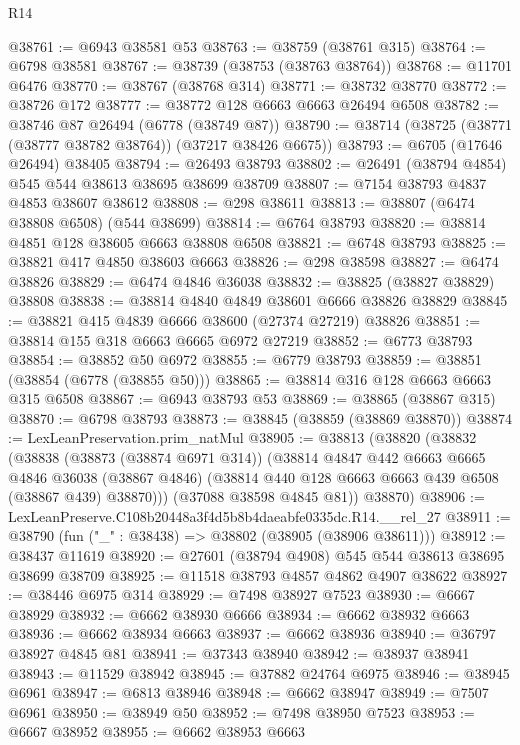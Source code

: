 \begin{lexlean}{R14}
\begin{coremodule}
@38761 := @6943 @38581 @53
@38763 := @38759 (@38761 @315)
@38764 := @6798 @38581
@38767 := @38739 (@38753 (@38763 @38764))
@38768 := @11701 @6476
@38770 := @38767 (@38768 @314)
@38771 := @38732 @38770
@38772 := @38726 @172
@38777 := @38772 @128 @6663 @6663 @26494 @6508
@38782 := @38746 @87 @26494 (@6778 (@38749 @87))
@38790 := @38714 (@38725 (@38771 (@38777 @38782 @38764)) (@37217 @38426 @6675))
@38793 := @6705 (@17646 @26494) @38405
@38794 := @26493 @38793
@38802 := @26491 (@38794 @4854) @545 @544 @38613 @38695 @38699 @38709
@38807 := @7154 @38793 @4837 @4853 @38607 @38612
@38808 := @298 @38611
@38813 := @38807 (@6474 @38808 @6508) (@544 @38699)
@38814 := @6764 @38793
@38820 := @38814 @4851 @128 @38605 @6663 @38808 @6508
@38821 := @6748 @38793
@38825 := @38821 @417 @4850 @38603 @6663
@38826 := @298 @38598
@38827 := @6474 @38826
@38829 := @6474 @4846 @36038
@38832 := @38825 (@38827 @38829) @38808
@38838 := @38814 @4840 @4849 @38601 @6666 @38826 @38829
@38845 := @38821 @415 @4839 @6666 @38600 (@27374 @27219) @38826
@38851 := @38814 @155 @318 @6663 @6665 @6972 @27219
@38852 := @6773 @38793
@38854 := @38852 @50 @6972
@38855 := @6779 @38793
@38859 := @38851 (@38854 (@6778 (@38855 @50)))
@38865 := @38814 @316 @128 @6663 @6663 @315 @6508
@38867 := @6943 @38793 @53
@38869 := @38865 (@38867 @315)
@38870 := @6798 @38793
@38873 := @38845 (@38859 (@38869 @38870))
@38874 := LexLeanPreservation.prim_natMul
@38905 := @38813
    (@38820
      (@38832
        (@38838
          (@38873 (@38874 @6971 @314))
          (@38814
            @4847
            @442
            @6663
            @6665
            @4846
            @36038
            (@38867 @4846)
            (@38814 @440 @128 @6663 @6663 @439 @6508 (@38867 @439) @38870)))
        (@37088 @38598 @4845 @81))
      @38870)
@38906 := LexLeanPreserve.C108b20448a3f4d5b8b4daeabfe0335dc.R14.__rel_27
@38911 := @38790 (fun ("_" : @38438) => @38802 (@38905 (@38906 @38611)))
@38912 := @38437 @11619
@38920 := @27601 (@38794 @4908) @545 @544 @38613 @38695 @38699 @38709
@38925 := @11518 @38793 @4857 @4862 @4907 @38622
@38927 := @38446 @6975 @314
@38929 := @7498 @38927 @7523
@38930 := @6667 @38929
@38932 := @6662 @38930 @6666
@38934 := @6662 @38932 @6663
@38936 := @6662 @38934 @6663
@38937 := @6662 @38936
@38940 := @36797 @38927 @4845 @81
@38941 := @37343 @38940
@38942 := @38937 @38941
@38943 := @11529 @38942
@38945 := @37882 @24764 @6975
@38946 := @38945 @6961
@38947 := @6813 @38946
@38948 := @6662 @38947
@38949 := @7507 @6961
@38950 := @38949 @50
@38952 := @7498 @38950 @7523
@38953 := @6667 @38952
@38955 := @6662 @38953 @6663

\end{coremodule}
\end{lexlean}
